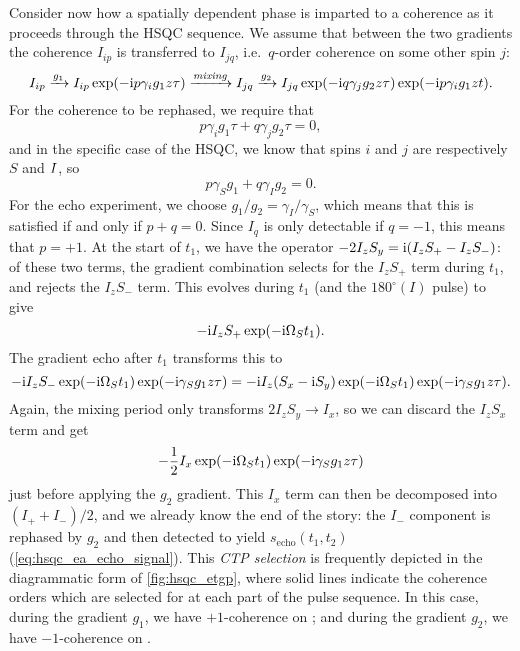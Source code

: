 Consider now how a spatially dependent phase is imparted to a coherence as it proceeds through the HSQC sequence.
We assume that between the two gradients the coherence $I_{ip}$ is transferred to $I_{jq}$, i.e.\ $q$-order coherence on some other spin $j$:
\begin{equation}
    \label{eq:shift_operator_evolution_grad}
    I_{ip} \xrightarrow[]{g_1} I_{ip} \exp(-\mathrm{i} p \gamma_i g_1 z \tau) \xrightarrow[]{\textit{mixing}} I_{jq} \xrightarrow[]{g_2} I_{jq}\exp(-\mathrm{i} q \gamma_j g_2 z \tau)\exp(-\mathrm{i} p \gamma_i g_1 z t).
\end{equation}
For the coherence to be rephased, we require that
\begin{equation}
    \label{eq:gradient_refocusing_condition}
    p\gamma_i g_1\tau + q\gamma_j g_2\tau = 0,
\end{equation}
and in the specific case of the HSQC, we know that spins $i$ and $j$ are respectively $S$ and $I\/$, so
\begin{equation}
    \label{eq:gradient_refocusing_hsqc}
    p\gamma_S g_1 + q\gamma_I g_2 = 0.
\end{equation}
For the echo experiment, we choose $g_1/g_2 = \gamma_I/\gamma_S$, which means that this is satisfied if and only if $p + q = 0$.
Since $I_{q}$ is only detectable if $q = -1$, this means that $p = +1$.
At the start of $t_1$, we have the operator $-2I_zS_y = \mathrm{i}(I_zS_+ - I_zS_-)$: of these two terms, the gradient combination selects for the $I_zS_+$ term during $t_1$, and rejects the $I_zS_-$ term.
This evolves during $t_1$ (and the $180^\circ(I)$ pulse) to give
\begin{equation}
    \label{eq:hsqc_echo_shift_aftert1}
    -\mathrm{i} I_zS_+ \exp(-\mathrm{i} \Omega_S t_1).
\end{equation}
The gradient echo after $t_1$ transforms this to
\begin{equation}
    \label{eq:hsqc_echo_shift_after_g1}
    -\mathrm{i} I_zS_- \exp(-\mathrm{i} \Omega_S t_1)\exp(-\mathrm{i} \gamma_S g_1 z\tau) = -\mathrm{i} I_z(S_x - \mathrm{i} S_y) \exp(-\mathrm{i} \Omega_S t_1)\exp(-\mathrm{i} \gamma_S g_1 z\tau).
\end{equation}
Again, the mixing period only transforms $2I_zS_y \to I_x$, so we can discard the $I_zS_x$ term and get
\begin{equation}
    \label{eq:hsqc_echo_shift_before_g2}
    -\frac{1}{2} I_x \exp(-\mathrm{i} \Omega_S t_1)\exp(-\mathrm{i} \gamma_S g_1 z\tau)
\end{equation}
just before applying the $g_2$ gradient.
This $I_x$ term can then be decomposed into $(I_+ + I_-)/2$, and we already know the end of the story: the $I_-$ component is rephased by $g_2$ and then detected to yield $s_\text{echo}(t_1, t_2)$ (\cref{eq:hsqc_ea_echo_signal}).
This \textit{CTP selection} is frequently depicted in the diagrammatic form of \cref{fig:hsqc_etgp}, where solid lines indicate the coherence orders which are selected for at each part of the pulse sequence.
In this case, during the gradient $g_1$, we have $+1$-coherence on \carbon{}; and during the gradient $g_2$, we have $-1$-coherence on \proton{}.

